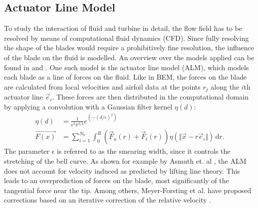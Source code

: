 \subsection{Actuator Line Model}
To study the interaction of fluid and turbine in detail, the flow field has to be resolved by means of computational fluid dynamics (CFD). Since fully resolving the shape of the blades would require a prohibitively fine resolution, the influence of the blade on the fluid is modelled. An overview over the models applied can be found in \cite{breton_survey_2017} and \cite{kheirabadi_quantitative_2019}. One such model is the actuator line model (ALM), which models each blade as a line of forces on the fluid. Like in BEM, the forces on the blade are calculated from local velocities and airfoil data at the points $r_j$ along the $i$th actuator line $\vec{e}_i$. These forces are then distributed in the computational domain by applying a convolution with a Gaussian filter kernel $\eta(d)$:
\begin{align}
	\eta(d) &= \frac{1}{\epsilon^2 \pi^{3/2}} e^{(-(d/\epsilon)^2)} \label{eq:gauss_alm} \\
	\vec{F(x)} &= \sum_{i=1}^{N_b} \int_{0}^{R} \left(\vec{F}_n(r)+ \vec{F}_t(r) \right) \eta(\Vert \vec{x} - r\vec{e}_i\Vert)\, \mathrm{d}r. \label{eq:ALM}
\end{align} The parameter $\epsilon$ is referred to as the smearing width, since it controls the stretching of the bell curve. As shown for example by Asmuth et. al \cite{asmuth_actuator_2019}, the ALM does not account for velocity induced as predicted by lifting line theory. This leads to an overprediction of forces on the blade, most significantly of the tangential force near the tip. Among others, Meyer-Forsting et al. have proposed corrections  based on an iterative correction of the relative velocity \cite{meyer_forsting_vortex-based_2019}. \cite{sorensen_numerical_2002}
